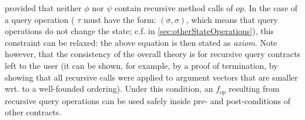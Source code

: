 provided that neither $\phi$  nor $\psi$ contain recursive method calls of $\mathit{op}$.
In the case of a query operation (\ie{} $\tau$ must have the form: $(\sigma,\sigma)$, which
means that query operations do not change the state; c.f.  in 
\autoref{sec:otherStateOperations}), this constraint can be relaxed: the above
equation is then stated as \emph{axiom}. Note however, that the consistency of the overall 
theory is for recursive query contracts left to the user (it can be shown, for example, by a proof
of termination, \ie{} by showing that all recursive calls were applied to  argument vectors that are 
smaller wrt. to a well-founded ordering). Under this condition, an $f_{op}$ resulting from recursive 
query operations can be used safely inside pre- and post-conditions of other contracts.

